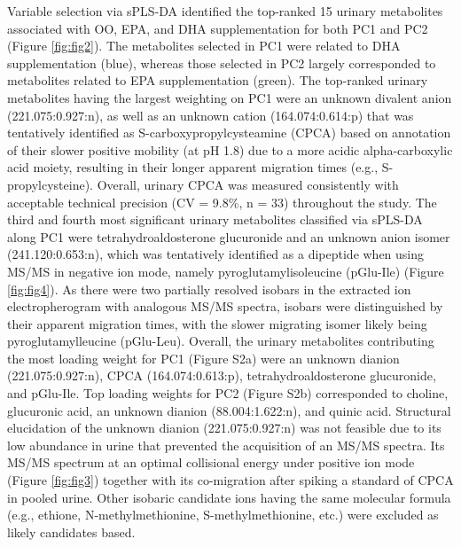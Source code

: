 \documentclass[journal=jacsat,manuscript=article]{achemso}
\begin{document}
Variable selection via sPLS-DA identified the top-ranked 15 urinary
metabolites associated with OO, EPA, and DHA supplementation for both
PC1 and PC2 (Figure \ref{fig:fig2}). The metabolites selected in PC1
were related to DHA supplementation (blue), whereas those selected in
PC2 largely corresponded to metabolites related to EPA supplementation
(green). The top-ranked urinary metabolites having the largest weighting
on PC1 were an unknown divalent anion (221.075:0.927:n), as well as an
unknown cation (164.074:0.614:p) that was tentatively identified as
S-carboxypropylcysteamine (CPCA) based on annotation of their slower
positive mobility (at pH 1.8) due to a more acidic alpha-carboxylic acid
moiety, resulting in their longer apparent migration times (e.g.,
S-propylcysteine). Overall, urinary CPCA was measured consistently with
acceptable technical precision (CV = 9.8\%, n = 33) throughout the
study. The third and fourth most significant urinary metabolites
classified via sPLS-DA along PC1 were tetrahydroaldosterone glucuronide
and an unknown anion isomer (241.120:0.653:n), which was tentatively
identified as a dipeptide when using MS/MS in negative ion mode, namely
pyroglutamylisoleucine (pGlu-Ile) (Figure \ref{fig:fig4}). As there were
two partially resolved isobars in the extracted ion electropherogram
with analogous MS/MS spectra, isobars were distinguished by their
apparent migration times, with the slower migrating isomer likely being
pyroglutamylleucine (pGlu-Leu). Overall, the urinary metabolites
contributing the most loading weight for PC1 (Figure S2a) were an
unknown dianion (221.075:0.927:n), CPCA (164.074:0.613:p),
tetrahydroaldosterone glucuronide, and pGlu-Ile. Top loading weights for
PC2 (Figure S2b) corresponded to choline, glucuronic acid, an unknown
dianion (88.004:1.622:n), and quinic acid. Structural elucidation of the
unknown dianion (221.075:0.927:n) was not feasible due to its low
abundance in urine that prevented the acquisition of an MS/MS spectra.
Its MS/MS spectrum at an optimal collisional energy under positive ion
mode (Figure \ref{fig:fig3}) together with its co-migration after
spiking a standard of CPCA in pooled urine. Other isobaric candidate
ions having the same molecular formula (e.g., ethione,
N-methylmethionine, S-methylmethionine, etc.) were excluded as likely
candidates based.
\end{document}
